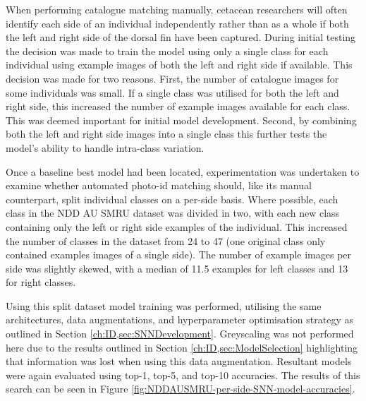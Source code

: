 When performing catalogue matching manually, cetacean researchers will often identify each side of an individual independently rather than as a whole if both the left and right side of the dorsal fin have been captured. During initial testing the decision was made to train the model using only a single class for each individual using example images of both the left and right side if available. This decision was made for two reasons. First, the number of catalogue images for some individuals was small. If a single class was utilised for both the left and right side, this increased the number of example images available for each class. This was deemed important for initial model development. Second, by combining both the left and right side images into a single class this further tests the model's ability to handle intra-class variation. 

Once a baseline best model had been located, experimentation was undertaken to examine whether automated photo-id matching should, like its manual counterpart, split individual classes on a per-side basis. Where possible, each class in the NDD AU SMRU dataset was divided in two, with each new class containing only the left or right side examples of the individual. This increased the number of classes in the dataset from 24 to 47 (one original class only contained examples images of a single side). The number of example images per side was slightly skewed, with a median of 11.5 examples for left classes and 13 for right classes.

Using this split dataset model training was performed, utilising the same architectures, data augmentations, and hyperparameter optimisation strategy as outlined in Section \ref{ch:ID,sec:SNNDevelopment}. Greyscaling was not performed here due to the results outlined in Section \ref{ch:ID,sec:ModelSelection} highlighting that information was lost when using this data augmentation. Resultant models were again evaluated using top-1, top-5, and top-10 accuracies. The results of this search can be seen in Figure \ref{fig:NDDAUSMRU-per-side-SNN-model-accuracies}.
		
